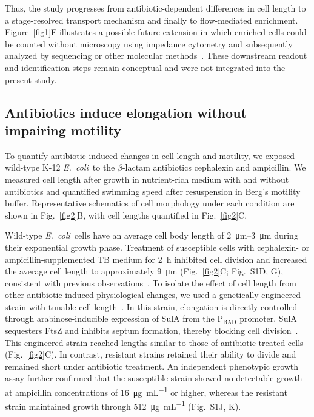 \documentclass[twoside,twocolumn,9pt]{article}
\newcommand{\ecoli}{{\it E.~coli}}
\begin{document}
    Thus, the study progresses from antibiotic-dependent differences in cell length to a stage-resolved transport mechanism and finally to flow-mediated enrichment. Figure~\ref{fig1}F illustrates a possible future extension in which enriched cells could be counted without microscopy using impedance cytometry and subsequently analyzed by sequencing or other molecular methods~\cite{Tang2022-kx,Zhu2024-de,Anjum2017-hu}. These downstream readout and identification steps remain conceptual and were not integrated into the present study.

    \subsection*{Antibiotics induce elongation without impairing motility}

    To quantify antibiotic-induced changes in cell length and motility, we exposed wild-type K-12 \ecoli\ to the $\beta$-lactam antibiotics cephalexin and ampicillin. We measured cell length after growth in nutrient-rich medium with and without antibiotics and quantified swimming speed after resuspension in Berg's motility buffer. Representative schematics of cell morphology under each condition are shown in Fig.~\ref{fig2}B, with cell lengths quantified in Fig.~\ref{fig2}C.
    
    Wild-type \ecoli\ cells have an average cell body length of \SIrange{2}{3}{\micro\metre} during their exponential growth phase. Treatment of susceptible cells with cephalexin- or ampicillin-supplemented TB medium for \SI{2}{\hour} inhibited cell division and increased the average cell length to approximately \SI{9}{\micro\metre} (Fig.~\ref{fig2}C; Fig.~S1D, G), consistent with previous observations~\cite{Maki2000-kp,Cylke2022-iy}.
    To isolate the effect of cell length from other antibiotic-induced physiological changes, we used a genetically engineered strain with tunable cell length~\cite{Gao2026-vq}.
    In this strain, elongation is directly controlled through arabinose-inducible expression of SulA from the P$_{\mathrm{BAD}}$ promoter. SulA sequesters FtsZ and inhibits septum formation, thereby blocking cell division~\cite{Higashitani1995-qn}. This engineered strain reached lengths similar to those of antibiotic-treated cells (Fig.~\ref{fig2}C). 
    In contrast, resistant strains retained their ability to divide and remained short under antibiotic treatment.
    An independent phenotypic growth assay further confirmed that the susceptible strain showed no detectable growth at ampicillin concentrations of \SI{16}{\micro\gram\per\milli\liter} or higher, whereas the resistant strain maintained growth through \SI{512}{\micro\gram\per\milli\liter} (Fig.~S1J, K).
    
\end{document}
